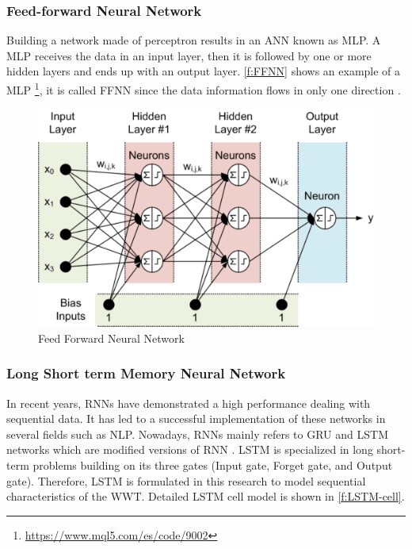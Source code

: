 \subsubsection{Feed-forward Neural Network}
Building a network made of perceptron results in an \ac{ANN} known as \ac{MLP}. A \ac{MLP} receives the data in an input layer, then it is followed by one or more hidden layers and ends up with an output layer.
\autoref{f:FFNN} shows an example of a \ac{MLP} \footnote{\url{https://www.mql5.com/es/code/9002}}, it is called \ac{FFNN} since the data information flows in only one direction \cite{geron2017}. 

\begin{figure}[h]
\centering
\includegraphics[width=12cm]{figures/Ch2/FFNN.pdf}
\caption{Feed Forward Neural Network}
\label{f:FFNN}
\end{figure}

\subsubsection{Long Short term Memory Neural Network}
In recent years, \ac{RNN}s have demonstrated a high performance dealing with sequential data. It has led to a successful implementation of these networks in several fields such as \ac{NLP}.
Nowadays, \ac{RNN}s mainly refers to \ac{GRU} and \ac{LSTM} networks which are modified versions of \ac{RNN} \cite{Guo2020}. \ac{LSTM} is specialized in long short-term problems building on its three gates (Input gate, Forget gate, and Output gate). Therefore, \ac{LSTM} is formulated in this research to model sequential characteristics of the \ac{WWT}. Detailed \ac{LSTM} cell model is shown in \autoref{f:LSTM-cell}.

